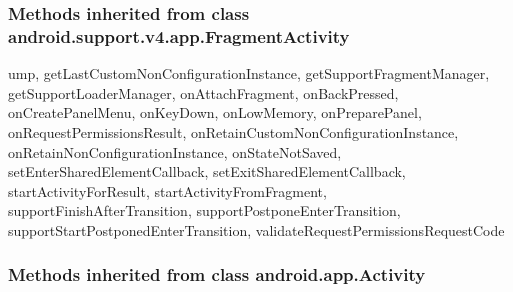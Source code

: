 \subsubsection{Methods inherited from class android.support.v4.app.FragmentActivity}

ump, getLastCustomNonConfigurationInstance, getSupportFragmentManager, getSupportLoaderManager, onAttachFragment, onBackPressed, onCreatePanelMenu, onKeyDown, onLowMemory, onPreparePanel, onRequestPermissionsResult, onRetainCustomNonConfigurationInstance, onRetainNonConfigurationInstance, onStateNotSaved, setEnterSharedElementCallback, setExitSharedElementCallback, startActivityForResult, startActivityFromFragment, supportFinishAfterTransition, supportPostponeEnterTransition, supportStartPostponedEnterTransition, validateRequestPermissionsRequestCode\\

\subsubsection{Methods inherited from class android.app.Activity}


